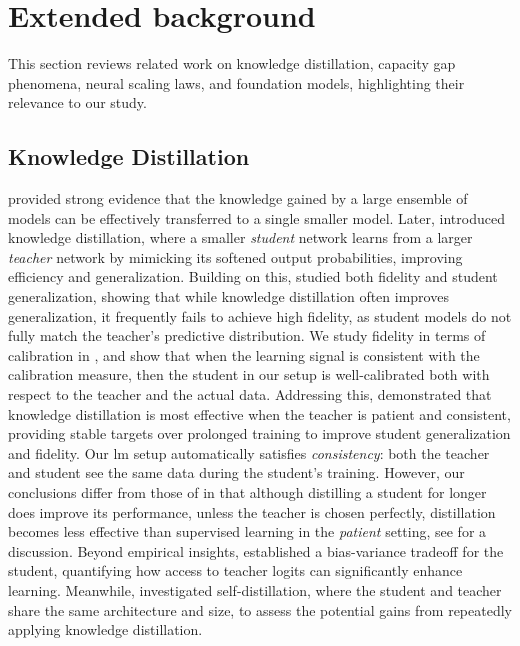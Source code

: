 \section{Extended background}
\label{sec:extended-background}

This section reviews related work on knowledge distillation, capacity gap phenomena, neural scaling laws, and foundation models, highlighting their relevance to our study.

\subsection{Knowledge Distillation}
\label{ssec:knowledge-distillation}
\citet{DBLP:conf/kdd/BucilaCN06} provided strong evidence that the knowledge gained by a large ensemble of models can be effectively transferred to a single smaller model. Later, \citet{DBLP:journals/corr/HintonVD15} introduced knowledge distillation, where a smaller \emph{student} network learns from a larger \emph{teacher} network by mimicking its softened output probabilities, improving efficiency and generalization.
Building on this, \citet{DBLP:conf/nips/StantonIKAW21} studied both fidelity and student generalization, showing that while knowledge distillation often improves generalization, it frequently fails to achieve high fidelity, as student models do not fully match the teacher's predictive distribution. We study fidelity in terms of calibration in , and show that when the learning signal is consistent with the calibration measure, then the student in our setup is well-calibrated both with respect to the teacher and the actual data. Addressing this, \citet{DBLP:conf/cvpr/BeyerZRMA022} demonstrated that knowledge distillation is most effective when the teacher is patient and consistent, providing stable targets over prolonged training to improve student generalization and fidelity. Our \gls{lm} setup automatically satisfies \emph{consistency}: both the teacher and student see the same data during the student's training.
However, our conclusions differ from those of \citet{DBLP:conf/cvpr/BeyerZRMA022} in that although distilling a student for longer does improve its performance, unless the teacher is chosen perfectly, distillation becomes less effective than supervised learning in the \emph{patient} setting, 
see 
for a discussion.
Beyond empirical insights, \citet{DBLP:journals/corr/abs-2005-10419} established a bias-variance tradeoff for the student, quantifying how access to teacher logits can significantly enhance learning. Meanwhile, \citet{DBLP:journals/corr/abs-2407-04600} investigated self-distillation, where the student and teacher share the same architecture and size, to assess the potential gains from repeatedly applying knowledge distillation.
